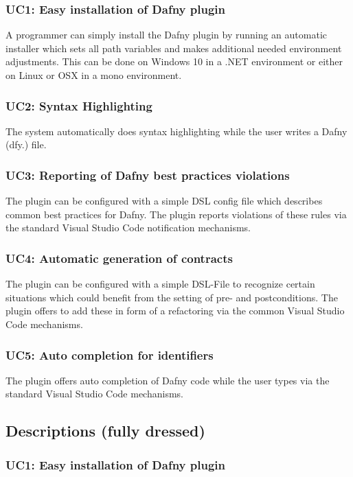 \subsubsection{UC1: Easy installation of Dafny plugin}
A programmer can simply install the Dafny plugin by running an automatic installer which sets all path variables and makes additional needed environment adjustments. This can be done on Windows 10 in a .NET environment or either on Linux or OSX in a mono environment.
\subsubsection{UC2: Syntax Highlighting}
The system automatically does syntax highlighting while the user writes a Dafny (dfy.) file.
\subsubsection{UC3: Reporting of Dafny best practices violations}
The plugin can be configured with a simple DSL config file which describes common best practices for Dafny. The plugin reports violations of these rules via the standard Visual Studio Code notification mechanisms.
\subsubsection{UC4: Automatic generation of contracts}
The plugin can be configured with a simple DSL-File to recognize certain situations which could benefit from the setting of pre- and postconditions. The plugin offers to add these in form of a refactoring via the common Visual Studio Code mechanisms.

\subsubsection{UC5: Auto completion for identifiers}
The plugin offers auto completion of Dafny code while the user types via the standard Visual Studio Code mechanisms.
\subsection{Descriptions (fully dressed)}

\subsubsection{UC1: Easy installation of Dafny plugin}

